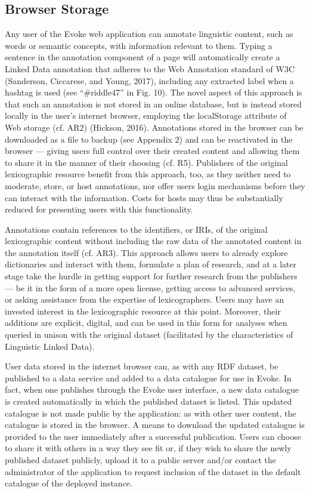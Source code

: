 \subsection{Browser Storage}
Any user of the Evoke web application can annotate linguistic content, such as words or semantic concepts, with information relevant to them. Typing a sentence in the annotation component of a page will automatically create a Linked Data annotation that adheres to the Web Annotation standard of W3C (Sanderson, Ciccarese, and Young, 2017), including any extracted label when a hashtag is used (see “\#riddle47” in Fig. 10). The novel aspect of this approach is that such an annotation is not stored in an online database, but is instead stored locally in the user’s internet browser, employing the localStorage attribute of Web storage (cf. AR2) (Hickson, 2016). Annotations stored in the browser can be downloaded as a file to backup (see Appendix 2) and can be reactivated in the browser — giving users full control over their created content and allowing them to share it in the manner of their choosing (cf. R5). Publishers of the original lexicographic resource benefit from this approach, too, as they neither need to moderate, store, or host annotations, nor offer users login mechanisms before they can interact with the information. Costs for hosts may thus be substantially reduced for presenting users with this functionality.

Annotations contain references to the identifiers, or IRIs, of the original lexicographic content without including the raw data of the annotated content in the annotation itself (cf. AR3). This approach allows users to already explore dictionaries and interact with them, formulate a plan of research, and at a later stage take the hurdle in getting support for further research from the publishers — be it in the form of a more open license, getting access to advanced services, or asking assistance from the expertise of lexicographers. Users may have an invested interest in the lexicographic resource at this point. Moreover, their additions are explicit, digital, and can be used in this form for analyses when queried in unison with the original dataset (facilitated by the characteristics of Linguistic Linked Data).

User data stored in the internet browser can, as with any RDF dataset, be published to a data service and added to a data catalogue for use in Evoke. In fact, when one publishes through the Evoke user interface, a new data catalogue is created automatically in which the published dataset is listed. This updated catalogue is not made public by the application: as with other user content, the catalogue is stored in the browser. A means to download the updated catalogue is provided to the user immediately after a successful publication. Users can choose to share it with others in a way they see fit or, if they wish to share the newly published dataset publicly, upload it to a public server and/or contact the administrator of the application to request inclusion of the dataset in the default catalogue of the deployed instance.

